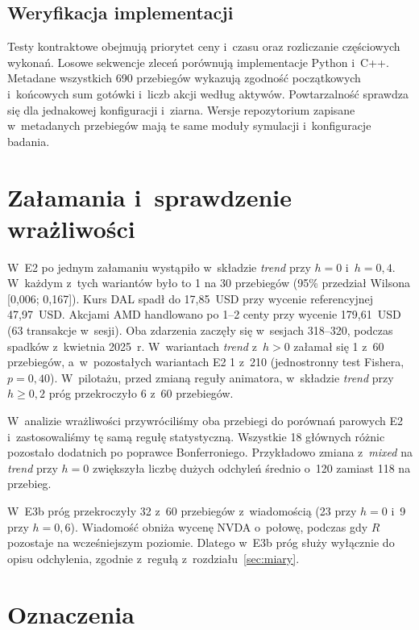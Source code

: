 \documentclass[11pt,a4paper]{article}
\newcommand{\cell}[1]{\textit{#1}}
\begin{document}
\FloatBarrier
\subsection{Weryfikacja implementacji}\label{sec:impl}
Testy kontraktowe obejmują priorytet ceny i~czasu oraz rozliczanie częściowych wykonań. Losowe sekwencje
zleceń porównują implementacje Python i~C++. Metadane wszystkich 690 przebiegów wykazują zgodność początkowych
i~końcowych sum gotówki i~liczb akcji według aktywów. Powtarzalność sprawdza się dla jednakowej konfiguracji i~ziarna.
Wersje repozytorium zapisane w~metadanych przebiegów mają te same moduły symulacji i~konfiguracje badania.

\FloatBarrier
\section{Załamania i~sprawdzenie wrażliwości}\label{sec:zal-osobno}

W~E2 po jednym załamaniu wystąpiło w~składzie \cell{trend} przy $h=0$ i~$h=0{,}4$. W~każdym z~tych
wariantów było to 1 na 30 przebiegów (95\% przedział Wilsona [0,006; 0,167]). Kurs DAL spadł do 17,85~USD
przy wycenie referencyjnej 47,97~USD. Akcjami AMD handlowano po 1--2 centy przy wycenie 179,61~USD
(63 transakcje w~sesji). Oba zdarzenia zaczęły się w~sesjach 318--320, podczas spadków z~kwietnia 2025~r.
W~wariantach \cell{trend} z~$h>0$ załamał się 1 z~60 przebiegów, a~w~pozostałych wariantach E2
1 z~210 (jednostronny test Fishera, $p=0{,}40$). W~pilotażu, przed zmianą reguły animatora, w~składzie
\cell{trend} przy $h\geq 0{,}2$ próg przekroczyło 6 z~60 przebiegów.

W~analizie wrażliwości przywróciliśmy oba przebiegi do porównań parowych E2 i~zastosowaliśmy tę samą
regułę statystyczną. Wszystkie 18 głównych różnic pozostało dodatnich po poprawce Bonferroniego.
Przykładowo zmiana z~\cell{mixed} na \cell{trend} przy $h=0$ zwiększyła liczbę dużych odchyleń
średnio o~120 zamiast 118 na przebieg.

\begin{samepage}
W~E3b próg przekroczyły 32 z~60 przebiegów z~wiadomością (23 przy $h=0$ i~9 przy $h=0{,}6$).
Wiadomość obniża wycenę NVDA o~połowę, podczas gdy $R$ pozostaje na wcześniejszym poziomie.
Dlatego w~E3b próg służy wyłącznie do opisu odchylenia, zgodnie z~regułą z~rozdziału~\ref{sec:miary}.\par
\end{samepage}

\clearpage
\section{Oznaczenia}\label{sec:oznaczenia}
\end{document}
